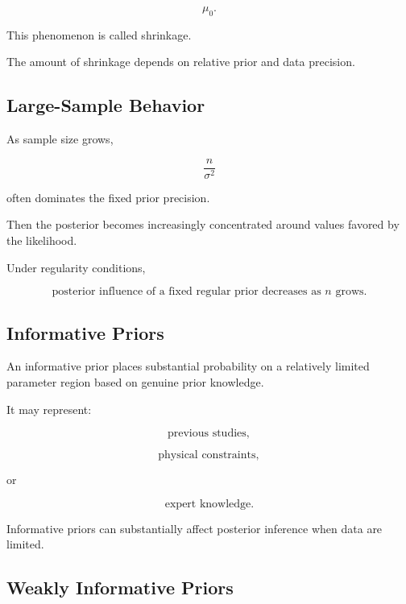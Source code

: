 \[
\mu_0.
\]

This phenomenon is called shrinkage.

The amount of shrinkage depends on relative prior and data precision.

\subsection{Large-Sample Behavior}
\label{subsec:bayesian-large-sample}

As sample size grows,

\[
\frac{n}{\sigma^2}
\]

often dominates the fixed prior precision.

Then the posterior becomes increasingly concentrated around values
favored by the likelihood.

Under regularity conditions,

\[
\boxed{
\text{posterior influence of a fixed regular prior decreases as }n
\text{ grows}.
}
\]

\subsection{Informative Priors}
\label{subsec:informative-priors}

An informative prior places substantial probability on a relatively
limited parameter region based on genuine prior knowledge.

It may represent:

\[
\boxed{
\text{previous studies},
}
\]

\[
\boxed{
\text{physical constraints},
}
\]

or

\[
\boxed{
\text{expert knowledge}.
}
\]

Informative priors can substantially affect posterior inference when data
are limited.

\subsection{Weakly Informative Priors}
\label{subsec:weakly-informative-priors}

